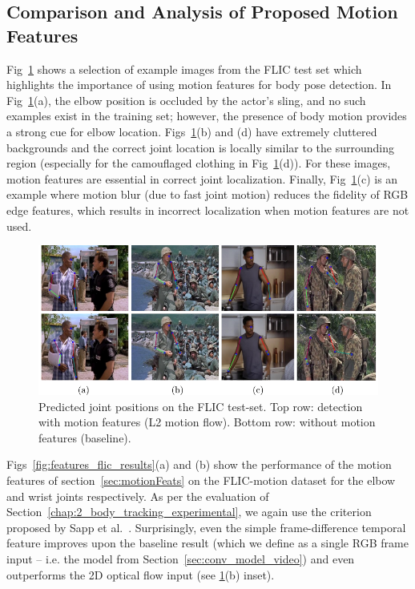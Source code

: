 \subsection{Comparison and Analysis of Proposed Motion Features}
\label{sec:resultsMotionFeats}

Fig~\ref{fig:with_without_motion} shows a selection of example images from the FLIC test set which highlights the importance of using motion features for body pose detection.  In Fig~\ref{fig:with_without_motion}(a), the elbow position is occluded by the actor's sling, and no such examples exist in the training set; however, the presence of body motion provides a strong cue for elbow location.  Figs~\ref{fig:with_without_motion}(b) and (d) have extremely cluttered backgrounds and the correct joint location is locally similar to the surrounding region (especially for the camouflaged clothing in Fig~\ref{fig:with_without_motion}(d)).  For these images, motion features are essential in correct joint localization.  Finally, Fig~\ref{fig:with_without_motion}(c) is an example where motion blur (due to fast joint motion) reduces the fidelity of RGB edge features, which results in incorrect localization when motion features are not used.

\begin{figure}[ht]
  \centering
\includegraphics[width=\textwidth]{figures_3_video_body_tracking/bl_vs_mf.png}
 \caption{Predicted joint positions on the FLIC test-set. Top row: detection with motion features (L2 motion flow). Bottom row: without motion features (baseline).}
  \label{fig:with_without_motion}
\end{figure} 

Figs~\ref{fig:features_flic_results}(a) and (b) show the performance of the motion features of section~\ref{sec:motionFeats} on the FLIC-motion dataset for the elbow and wrist joints respectively. As per the evaluation of Section~\ref{chap:2_body_tracking_experimental}, we again use the criterion proposed by Sapp et al.~\cite{modec}. Surprisingly, even the simple frame-difference temporal feature improves upon the baseline result (which we define as a single RGB frame input -- i.e. the model from Section~\ref{sec:conv_model_video}) and even outperforms the 2D optical flow input (see \ref{fig:with_without_motion}(b) inset).

